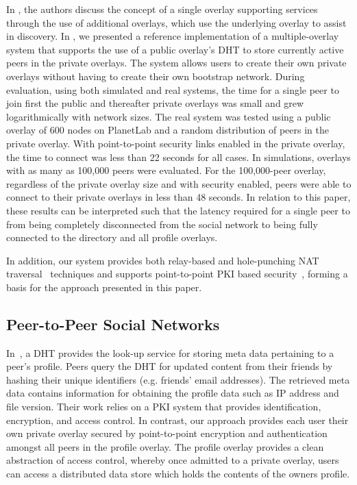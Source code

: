\documentclass[letterpaper,twocolumn,10pt]{article}
\begin{document}
In \cite{one_ring, can_multicast}, the authors discuss the concept of a
single overlay supporting services through the use of additional overlays,
which use the underlying overlay to assist in discovery.  In \cite{icdcs10}, we
presented a reference implementation of a multiple-overlay system that supports
the use of a public overlay's DHT to store currently active peers in the private
overlays. The system allows users to create their own private overlays without
having to create their own bootstrap network.  During evaluation, using both
simulated and real systems, the time for a single peer to join first the public
and thereafter private overlays was small and grew logarithmically with network
sizes.  The real system was tested using a public overlay of 600 nodes on
PlanetLab and a random distribution of peers in the private overlay.  With
point-to-point security links enabled in the private overlay, the time to
connect was less than 22 seconds for all cases. In simulations, overlays with as
many as 100,000 peers were evaluated.  For the 100,000-peer overlay, regardless
of the private overlay size and with security enabled, peers were able to connect
to their private overlays in less than 48 seconds.  
In relation to this paper, these results can be interpreted such that the latency
required for a single peer to from being completely disconnected from the social network
to being fully connected to the directory and all profile overlays.

In addition, our system provides both relay-based and hole-punching NAT
traversal~\cite{nsdi10} techniques and supports point-to-point
PKI based security~\cite{icdcs10}, forming a basis for the approach
presented in this paper.

\subsection{Peer-to-Peer Social Networks}
In~\cite{peerson}, a DHT provides the look-up service for storing meta data
pertaining to a peer's profile. Peers query the DHT for updated content from 
their friends by hashing their unique identifiers (e.g. friends' email
addresses).  The retrieved meta data contains information for obtaining the
profile data such as IP address and file version. Their work relies
on a PKI system that provides identification, encryption, and access control.
In contrast, our approach provides each user their own private overlay secured
by point-to-point encryption and authentication amongst all peers in the profile
overlay.  The profile overlay provides a clean abstraction of access control,
whereby once admitted to a private overlay, users can access a distributed data
store which holds the contents of the owners profile.
\end{document}
